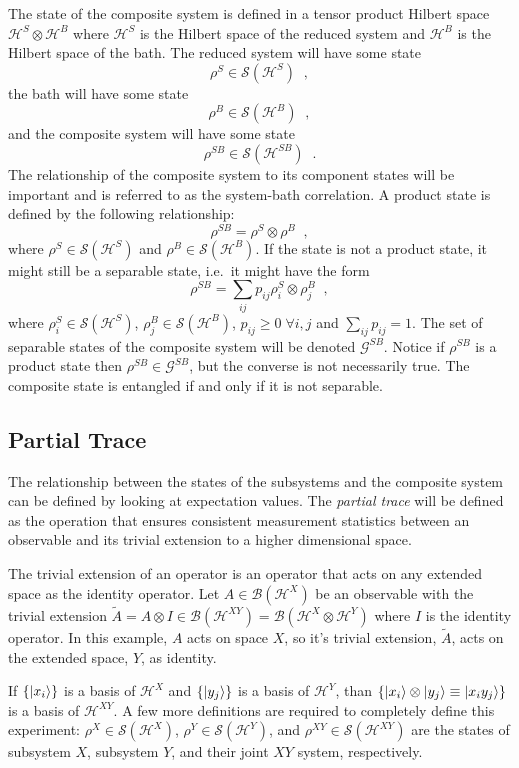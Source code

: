 The state of the composite system is defined in a tensor product Hilbert space $\mathcal{H}^S\otimes\mathcal{H}^B$ where $\mathcal{H}^S$ is the Hilbert space of the reduced system and $\mathcal{H}^B$ is the Hilbert space of the bath.  The reduced system will have some state
$$
\rho^S\in\mathcal{S}(\mathcal{H}^S)\;\;,
$$
the bath will have some state
$$
\rho^B\in\mathcal{S}(\mathcal{H}^B)\;\;,
$$
and the composite system will have some state
$$
\rho^{SB}\in\mathcal{S}(\mathcal{H}^{SB})\;\;.
$$
The relationship of the composite system to its component states will be important and is referred to as the system-bath correlation.  A product state is defined by the following relationship:
$$
\rho^{SB} = \rho^{S}\otimes\rho^{B}\;\;,
$$
where $\rho^S\in\mathcal{S}(\mathcal{H}^S)$ and $\rho^B\in\mathcal{S}(\mathcal{H}^B)$.  If the state is not a product state, it might still be a separable state, i.e.\ it might have the form
$$
\rho^{SB} = \sum_{ij} p_{ij} \rho^{S}_i\otimes\rho^{B}_j\;\;,
$$
where $\rho^S_i\in\mathcal{S}(\mathcal{H}^S)$, $\rho^B_j\in\mathcal{S}(\mathcal{H}^B)$, $p_{ij}\ge0\;\forall i,j$ and $\sum_{ij} p_{ij}=1$. The set of separable states of the composite system will be denoted $\mathcal{G}^{SB}$.  Notice if $\rho^{SB}$ is a product state then $\rho^{SB}\in\mathcal{G}^{SB}$, but the converse is not necessarily true.  The composite state is entangled if and only if it is not separable.  

\subsection{Partial Trace}
\label{sec:parttrace}
The relationship between the states of the subsystems and the composite system can be defined by looking at expectation values.  The {\em partial trace} will be defined as the operation that ensures consistent measurement statistics between an observable and its trivial extension to a higher dimensional space.

The trivial extension of an operator is an operator that acts on any extended space as the identity operator.  Let $A\in\mathcal{B}(\mathcal{H}^X)$ be an observable with the trivial extension $\tilde{A}=A\otimes I\in\mathcal{B}(\mathcal{H}^{XY})=\mathcal{B}(\mathcal{H}^X\otimes\mathcal{H}^Y)$ where $I$ is the identity operator.  In this example, $A$ acts on space $X$, so it's trivial extension, $\tilde{A}$, acts on the extended space, $Y$, as identity.

If $\{\left|x_i\right\rangle\}$ is a basis of $\mathcal{H}^X$ and $\{\left|y_j\right\rangle\}$ is a basis of $\mathcal{H}^Y$, than $\{\left|x_i\right\rangle\otimes\left|y_j\right\rangle\equiv\left|x_iy_j\right\rangle\}$ is a basis of $\mathcal{H}^{XY}$.  A few more definitions are required to completely define this experiment: $\rho^X\in\mathcal{S}(\mathcal{H}^X)$, $\rho^Y\in\mathcal{S}(\mathcal{H}^Y)$, and $\rho^{XY}\in\mathcal{S}(\mathcal{H}^{XY})$ are the states of subsystem $X$, subsystem $Y$, and their joint $XY$ system, respectively.

